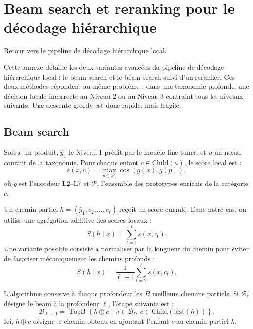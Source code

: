 \documentclass[12pt,a4paper]{report}
\begin{document}
\section*{Beam search et reranking pour le décodage hiérarchique}
\label{sec:beam-reranker-annex}

\noindent\hyperref[sec:l2-l7-pipeline-local-decoding]{Retour vers le pipeline de décodage hiérarchique local.}

Cette annexe détaille les deux variantes avancées du pipeline de décodage hiérarchique local : le beam search et le beam search suivi d'un reranker. Ces deux méthodes répondent au même problème : dans une taxonomie profonde, une décision locale incorrecte au Niveau 2 ou au Niveau 3 contraint tous les niveaux suivants. Une descente greedy est donc rapide, mais fragile.

\subsection*{Beam search}

Soit $x$ un produit, $\hat{y}_1$ le Niveau 1 prédit par le modèle fine-tuner, et $u$ un nœud courant de la taxonomie. Pour chaque enfant $c \in \mathrm{Child}(u)$, le score local est :
\begin{equation}
    s(x,c)
    =
    \max_{p \in \mathcal{P}_c}
    \cos\left(g(x),g(p)\right),
\end{equation}
où $g$ est l'encodeur L2--L7 et $\mathcal{P}_c$ l'ensemble des prototypes enrichis de la catégorie $c$.

Un chemin partiel $h=(\hat{y}_1,c_2,\ldots,c_\ell)$ reçoit un score cumulé. Dans notre cas, on utilise une agrégation additive des scores locaux :
\begin{equation}
    S(h \mid x)
    =
    \sum_{t=2}^{\ell} s(x,c_t).
\end{equation}
Une variante possible consiste à normaliser par la longueur du chemin pour éviter de favoriser mécaniquement les chemins profonds :
\begin{equation}
    \bar{S}(h \mid x)
    =
    \frac{1}{\ell-1}
    \sum_{t=2}^{\ell} s(x,c_t).
\end{equation}

L'algorithme conserve à chaque profondeur les $B$ meilleurs chemins partiels. Si $\mathcal{B}_\ell$ désigne le beam à la profondeur $\ell$, l'étape suivante est :
\begin{equation}
    \mathcal{B}_{\ell+1}
    =
    \operatorname{TopB}
    \left\{
    h \oplus c
    \;:\;
    h \in \mathcal{B}_\ell,\ 
    c \in \mathrm{Child}(\mathrm{last}(h))
    \right\}.
\end{equation}
Ici, $h \oplus c$ désigne le chemin obtenu en ajoutant l'enfant $c$ au chemin partiel $h$.
\end{document}
